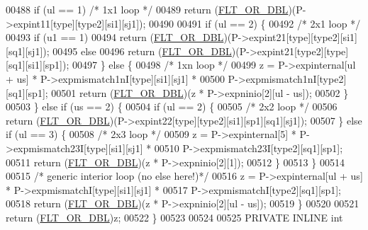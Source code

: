\begin{DoxyCode}
00488       \textcolor{keywordflow}{if} (ul == 1)                     \textcolor{comment}{/* 1x1 loop */}
00489         \textcolor{keywordflow}{return} (\hyperlink{group__data__structures_ga31125aeace516926bf7f251f759b6126}{FLT\_OR\_DBL})(P->expint11[type][type2][si1][sj1]);
00490 
00491       \textcolor{keywordflow}{if} (ul == 2) \{
00492         \textcolor{comment}{/* 2x1 loop */}
00493         \textcolor{keywordflow}{if} (u1 == 1)
00494           \textcolor{keywordflow}{return} (\hyperlink{group__data__structures_ga31125aeace516926bf7f251f759b6126}{FLT\_OR\_DBL})(P->expint21[type][type2][si1][sq1][sj1]);
00495         \textcolor{keywordflow}{else}
00496           \textcolor{keywordflow}{return} (\hyperlink{group__data__structures_ga31125aeace516926bf7f251f759b6126}{FLT\_OR\_DBL})(P->expint21[type2][type][sq1][si1][sp1]);
00497       \} \textcolor{keywordflow}{else} \{
00498         \textcolor{comment}{/* 1xn loop */}
00499         z = P->expinternal[ul + us] * P->expmismatch1nI[type][si1][sj1] *
00500             P->expmismatch1nI[type2][sq1][sp1];
00501         \textcolor{keywordflow}{return} (\hyperlink{group__data__structures_ga31125aeace516926bf7f251f759b6126}{FLT\_OR\_DBL})(z * P->expninio[2][ul - us]);
00502       \}
00503     \} \textcolor{keywordflow}{else} \textcolor{keywordflow}{if} (us == 2) \{
00504       \textcolor{keywordflow}{if} (ul == 2) \{
00505         \textcolor{comment}{/* 2x2 loop */}
00506         \textcolor{keywordflow}{return} (\hyperlink{group__data__structures_ga31125aeace516926bf7f251f759b6126}{FLT\_OR\_DBL})(P->expint22[type][type2][si1][sp1][sq1][sj1]);
00507       \} \textcolor{keywordflow}{else} \textcolor{keywordflow}{if} (ul == 3) \{
00508         \textcolor{comment}{/* 2x3 loop */}
00509         z = P->expinternal[5] * P->expmismatch23I[type][si1][sj1] *
00510             P->expmismatch23I[type2][sq1][sp1];
00511         \textcolor{keywordflow}{return} (\hyperlink{group__data__structures_ga31125aeace516926bf7f251f759b6126}{FLT\_OR\_DBL})(z * P->expninio[2][1]);
00512       \}
00513     \}
00514 
00515     \textcolor{comment}{/* generic interior loop (no else here!)*/}
00516     z = P->expinternal[ul + us] * P->expmismatchI[type][si1][sj1] *
00517         P->expmismatchI[type2][sq1][sp1];
00518     \textcolor{keywordflow}{return} (\hyperlink{group__data__structures_ga31125aeace516926bf7f251f759b6126}{FLT\_OR\_DBL})(z * P->expninio[2][ul - us]);
00519   \}
00520 
00521   \textcolor{keywordflow}{return} (\hyperlink{group__data__structures_ga31125aeace516926bf7f251f759b6126}{FLT\_OR\_DBL})z;
00522 \}
00523 
00524 
00525 PRIVATE INLINE \textcolor{keywordtype}{int}

\end{DoxyCode}
